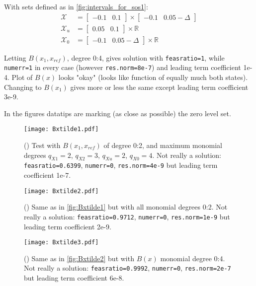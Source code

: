 With sets defined as in \autoref{fig:intervals_for_sos1}:
\begin{align}
\mathcal{X} &= \begin{bmatrix} -0.1 & 0.1\end{bmatrix} \times \begin{bmatrix} -0.1 & 0.05-\Delta\end{bmatrix}\\
\mathcal{X}_u &= \begin{bmatrix} 0.05 & 0.1\end{bmatrix} \times \mathbb{R}\\
\mathcal{X}_0 &= \begin{bmatrix} -0.1 & 0.05-\Delta\end{bmatrix} \times \mathbb{R}
\end{align}

Letting $B(x_1,x_{ref})$, degree 0:4, gives solution with \texttt{feasratio=1}, while \texttt{numerr=1} in every case (however \texttt{res.norm=8e-7}) and leading term coefficient 1e-4. Plot of $B(x)$ looks "okay" (looks like function of equally much both states). Changing to $B(x_1)$ gives more or less the same except leading term coefficient 3e-9.

In the figures datatips are marking (as close as possible) the zero level set.

\begin{figure}[htbp]
\centering\texttt{[image: Bxtilde1.pdf]}
\caption{() Test with $B(x_1,x_{ref})$ of degree 0:2, and maximum monomial degrees $q_{X1}=2$, $q_{X2}=3$, $q_{Xu}=2$, $q_{X0}=4$. Not really a solution: \texttt{feasratio=0.6399}, \texttt{numerr=0}, \texttt{res.norm=4e-9} but leading term coefficient 1e-7.}
\label{fig:Bxtilde1}
\end{figure}

\begin{figure}[htbp]
\centering\texttt{[image: Bxtilde2.pdf]}
\caption{() Same as in \autoref{fig:Bxtilde1} but with all monomial degrees 0:2. Not really a solution: \texttt{feasratio=0.9712}, \texttt{numerr=0}, \texttt{res.norm=1e-9} but leading term coefficient 2e-9.}
\label{fig:Bxtilde2}
\end{figure}

\begin{figure}[htbp]
\centering\texttt{[image: Bxtilde3.pdf]}
\caption{() Same as in \autoref{fig:Bxtilde2} but with $B(x)$ monomial degree 0:4. Not really a solution: \texttt{feasratio=0.9992}, \texttt{numerr=0}, \texttt{res.norm=2e-7} but leading term coefficient 6e-8.}
\label{fig:Bxtilde3}
\end{figure}

